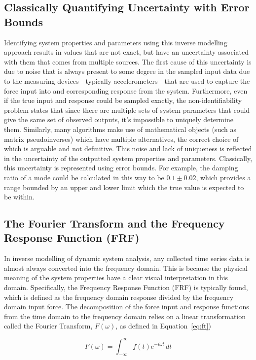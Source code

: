 \documentclass[12pt]{article}
\begin{document}
    \subsection{Classically Quantifying Uncertainty with Error Bounds}
    Identifying system properties and parameters using this inverse modelling approach results in values that are not exact, but have an uncertainty associated with them that comes from multiple sources.
    The first cause of this uncertainty is due to noise that is always present to some degree in the sampled input data due to the measuring devices - typically accelerometers - that are used to capture the force input into and corresponding response from the system.
    Furthermore, even if the true input and response could be sampled exactly, the non-identifiability problem states that since there are multiple sets of system parameters that could give the same set of observed outputs, it's impossible to uniquely determine them.
    Similarly, many algorithms make use of mathematical objects (such as matrix pseudoinverses) which have multiple alternatives, the correct choice of which is arguable and not definitive.
    This noise and lack of uniqueness is reflected in the uncertainty of the outputted system properties and parameters.
    Classically, this uncertainty is represented using error bounds.
    For example, the damping ratio of a mode could be calculated in this way to be $0.1 \pm 0.02$, which provides a range bounded by an upper and lower limit which the true value is expected to be within.


    \subsection{The Fourier Transform and the Frequency Response Function (FRF)}

    In inverse modelling of dynamic system analysis, any collected time series data is almost always converted into the frequency domain.
    This is because the physical meaning of the system properties have a clear visual interpretation in this domain. %
    Specifically, the Frequency Response Function (FRF) is typically found, which is defined as the frequency domain response divided by the frequency domain input force.
    The decomposition of the force input and response functions from the time domain to the frequency domain relies on a linear transformation called the Fourier Transform, $F(\omega)$, as defined in Equation~\ref{eq:ft})

    \begin{equation}
        F(\omega) = \int_{-\infty}^{\infty} f(t) e^{-i \omega t} \, dt\label{eq:ft}
    \end{equation}
\end{document}

